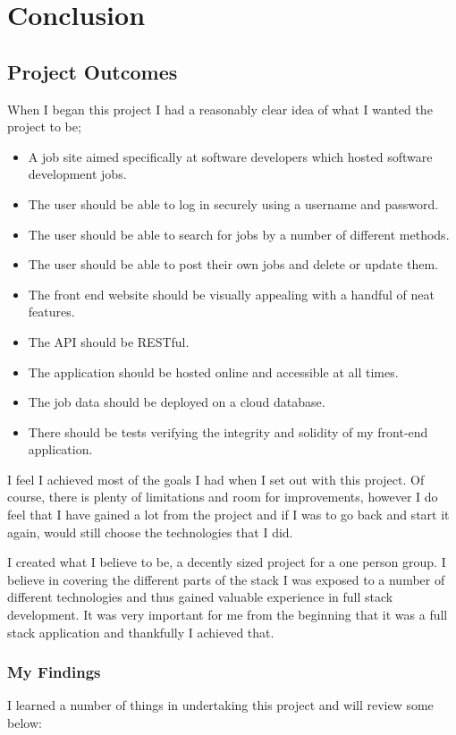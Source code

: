 \chapter{Conclusion}
\section{Project Outcomes}
When I began this project I had a reasonably clear idea of what I wanted the project to be;

\begin{itemize}
    \item A job site aimed specifically at software developers which hosted software development jobs.
    \item The user should be able to log in securely using a username and password.
    \item The user should be able to search for jobs by a number of different methods.
    \item The user should be able to post their own jobs and delete or update them.
    \item The front end website should be visually appealing with a handful of neat features.
    \item The API should be RESTful.
    \item The application should be hosted online and accessible at all times.
    \item The job data should be deployed on a cloud database.
    \item There should be tests verifying the integrity and solidity of my front-end application.
\end{itemize}

I feel I achieved most of the goals I had when I set out with this project. Of course, there is plenty of limitations and room for improvements, however I do feel that I have gained a lot from the project and if I was to go back and start it again, would still choose the technologies that I did.

I created what I believe to be, a decently sized project for a one person group. I believe in covering the different parts of the stack I was exposed to a number of different technologies and thus gained valuable experience in full stack development. It was very important for me from the beginning that it was a full stack application and thankfully I achieved that.

\subsection{My Findings}
I learned a number of things in undertaking this project and will review some below:

